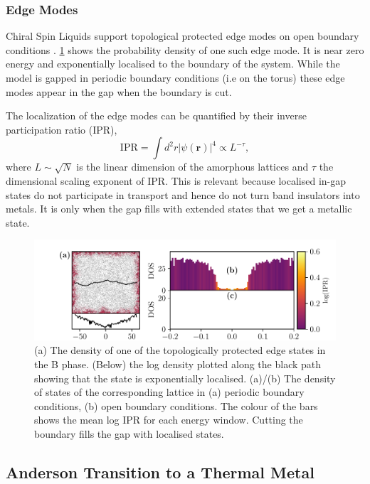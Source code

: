 \hypertarget{edge-modes}{%
\subsubsection{Edge Modes}\label{edge-modes}}

Chiral Spin Liquids support topological protected edge modes on open boundary conditions \autocite{qi_general_2006}. \cref{fig:edge_modes} shows the probability density of one such edge mode. It is near zero energy and exponentially localised to the boundary of the system. While the model is gapped in periodic boundary conditions (i.e on the torus) these edge modes appear in the gap when the boundary is cut.

The localization of the edge modes can be quantified by their inverse participation ratio (IPR), \[\mathrm{IPR} = \int d^2r|\psi(\mathbf{r})|^4  \propto L^{-\tau},\] where \(L\sim\sqrt{N}\) is the linear dimension of the amorphous lattices and \(\tau\) the dimensional scaling exponent of IPR. This is relevant because localised in-gap states do not participate in transport and hence do not turn band insulators into metals. It is only when the gap fills with extended states that we get a metallic state.

\begin{figure}
\hypertarget{fig:edge_modes}{%
\centering
\includegraphics[width=1\textwidth,height=\textheight]{figure_code/amk_chapter/results/edge_modes/edge_modes}
\caption[Edges States and Density of States]{(a) The density of one of the topologically protected edge
states in the B phase. (Below) the log density plotted along the black
path showing that the state is exponentially localised. (a)/(b) The
density of states of the corresponding lattice in (a) periodic boundary
conditions, (b) open boundary conditions. The colour of the bars shows
the mean log IPR for each energy window. Cutting the boundary fills the
gap with localised states.}\label{fig:edge_modes}
}
\end{figure}

\hypertarget{anderson-transition-to-a-thermal-metal}{%
\subsection{Anderson Transition to a Thermal Metal}\label{anderson-transition-to-a-thermal-metal}}

